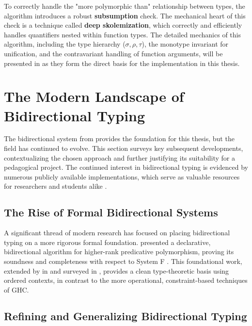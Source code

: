 To correctly handle the "more polymorphic than" relationship between types, the algorithm introduces a robust \textbf{subsumption} check. The mechanical heart of this check is a technique called \textbf{deep skolemization}, which correctly and efficiently handles quantifiers nested within function types. The detailed mechanics of this algorithm, including the type hierarchy ($\sigma, \rho, \tau$), the monotype invariant for unification, and the contravariant handling of function arguments, will be presented in  as they form the direct basis for the implementation in this thesis.

\section{The Modern Landscape of Bidirectional Typing}
\label{chap:LiteratureReview:sec:TypeInferenceAlgorithm}

The bidirectional system from \cite{jones-practical-2007} provides the foundation for this thesis, but the field has continued to evolve. This section surveys key subsequent developments, contextualizing the chosen approach and further justifying its suitability for a pedagogical project. The continued interest in bidirectional typing is evidenced by numerous publicly available implementations, which serve as valuable resources for researchers and students alike \cite{github-goldenberg-artem-goldenbergbidirectionalsystem-2025, github-choi-kwanghoonbidi-2025, github-chen-cu1ch3ntype-inference-zoo-2025}.

\subsection{The Rise of Formal Bidirectional Systems}

A significant thread of modern research has focused on placing bidirectional typing on a more rigorous formal foundation. \citeauthor{dunfield-complete-2013} \cite{dunfield-complete-2013} presented a declarative, bidirectional algorithm for higher-rank predicative polymorphism, proving its soundness and completeness with respect to System F \cite{selinger-lecture-2013}. This foundational work, extended by \citeauthor{dunfield-sound-2019} in \cite{dunfield-sound-2019} and surveyed in \cite{dunfield-bidirectional-2020}, provides a clean type-theoretic basis using ordered contexts, in contrast to the more operational, constraint-based techniques of GHC.

\subsection{Refining and Generalizing Bidirectional Typing}


